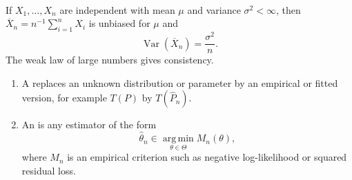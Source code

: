 \begin{example} \label{ex:sample-mean-estimator} \\
If $X_1,\ldots,X_n$ are independent with mean $\mu$ and variance $\sigma^2<\infty$, then $\overline{X}_n=n^{-1}\sum_{i=1}^nX_i$ is unbiased for $\mu$ and
\[
\operatorname{Var}(\overline{X}_n)=\frac{\sigma^2}{n}.
\]
The weak law of large numbers gives consistency.
\end{example}

\begin{definition} \label{def:plug-in-estimator-and-m-estimator} 
\begin{enumerate}[label=(\roman*)]
\setlength{\itemsep}{0pt}
\item A  replaces an unknown distribution or parameter by an empirical or fitted version, for example $T(P)$ by $T(\widehat{P}_n)$.
\item An  is any estimator of the form
\[
\widehat{\theta}_n\in\operatorname*{arg\,min}_{\theta\in\Theta}M_n(\theta),
\]
where $M_n$ is an empirical criterion such as negative log-likelihood or squared residual loss.
\end{enumerate}
\end{definition}
